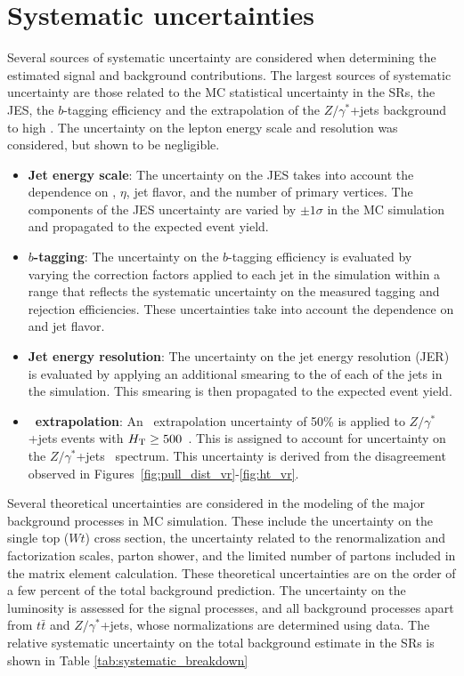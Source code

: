 \section{Systematic uncertainties}
\label{sec:systematics}

Several sources of systematic uncertainty are considered when determining
the estimated signal and background contributions.
The largest sources of systematic uncertainty are those related to the
MC statistical uncertainty in the SRs, the JES, the $b$-tagging efficiency
and the extrapolation of the $Z/\gamma^{*}$+jets background to high \HT. 
The uncertainty on the lepton energy scale and resolution was considered,
but shown to be negligible.

\begin{itemize}
\item \textbf{Jet energy scale}:
The uncertainty on the JES takes into account the dependence on \pt, $\eta$,
jet flavor, and the number of primary vertices. The components of the JES
uncertainty are varied by $\pm1\sigma$ in the MC simulation and propagated to
the expected event yield.
\item \textbf{$b$-tagging}:
The uncertainty on the $b$-tagging efficiency is evaluated by varying the
correction factors applied to each jet in the simulation within a range that
reflects the systematic uncertainty on the measured tagging and rejection
efficiencies. These uncertainties take into account the dependence on \pt and
jet flavor.
\item \textbf{Jet energy resolution}:
  The uncertainty on the jet energy resolution (JER) is evaluated by
  applying an additional smearing to the \pt of each of the jets in the
  simulation. This smearing is then propagated to the expected event yield.
\item \textbf{\HT\ extrapolation}:
An \HT\ extrapolation uncertainty of 50\% is applied to $Z/\gamma^{*}$+jets
events with $H_{\mathrm{T}} \geq 500$~\GeV. This is assigned to account for
uncertainty on the $Z/\gamma^{*}$+jets \HT\ spectrum. This uncertainty
is derived from the disagreement observed in
Figures~\ref{fig:pull_dist_vr}-\ref{fig:ht_vr}.
\end{itemize}

Several theoretical uncertainties are considered in the modeling of the major
background processes in MC simulation. These include the uncertainty on the
single top ($Wt$) cross section, the uncertainty related to the renormalization
and factorization scales, parton shower, and the limited number of partons
included in the matrix element calculation. These theoretical uncertainties
are on the order of a few percent of the total background prediction. The
uncertainty on the luminosity is assessed for the signal processes, and all
background processes apart from $t\bar{t}$ and $Z/\gamma^{*}$+jets, whose
normalizations are determined using data.
The relative systematic uncertainty on the total background estimate in the
SRs is shown in Table \ref{tab:systematic_breakdown}

